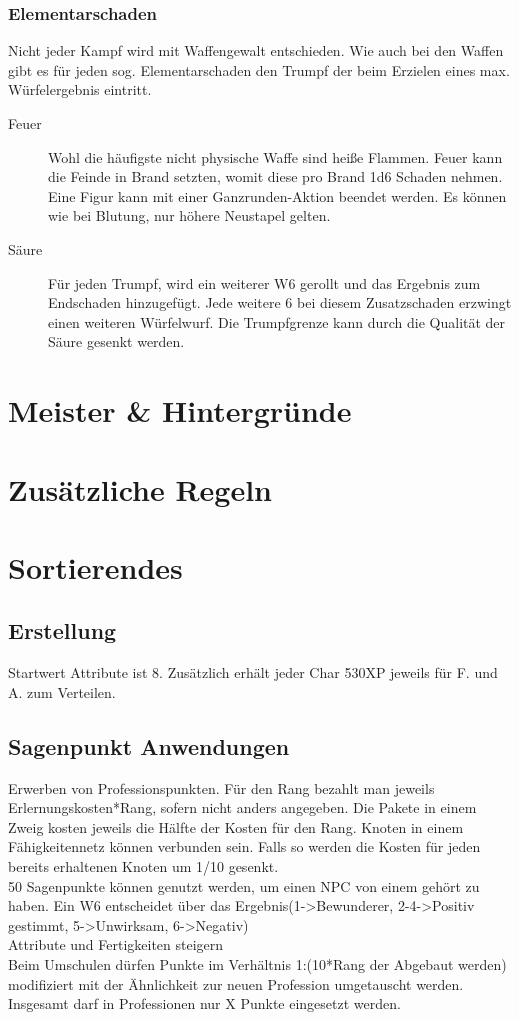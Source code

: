 \documentclass[a4paper,12pt,oneside]{book}
\begin{document}
\section{Elementarschaden}
Nicht jeder Kampf wird mit Waffengewalt entschieden. Wie auch bei den Waffen gibt es für jeden sog. Elementarschaden den Trumpf der beim Erzielen eines max. Würfelergebnis eintritt.
\begin{description}
\item[Feuer]Wohl die häufigste nicht physische Waffe sind heiße Flammen. Feuer kann die Feinde in Brand setzten, womit diese pro Brand 1d6 Schaden nehmen. Eine Figur kann mit einer Ganzrunden-Aktion beendet werden. Es können wie bei Blutung, nur höhere Neustapel gelten.
\item[Säure]Für jeden Trumpf, wird ein weiterer W6 gerollt und das Ergebnis zum Endschaden hinzugefügt. Jede weitere 6 bei diesem Zusatzschaden erzwingt einen weiteren Würfelwurf. Die Trumpfgrenze kann durch die Qualität der Säure gesenkt werden.
\end{description}

\part{Meister \& Hintergründe}
\setcounter{chapter}{0}
\part{Zusätzliche Regeln}
\setcounter{chapter}{0}

\part{Sortierendes}

\chapter{Erstellung}
Startwert Attribute ist 8.
Zusätzlich erhält jeder Char 530XP jeweils für F. und A. zum Verteilen.

\chapter{Sagenpunkt Anwendungen}
Erwerben von Professionspunkten. Für den Rang bezahlt man jeweils Erlernungskosten*Rang, sofern nicht anders angegeben. Die Pakete in einem Zweig kosten jeweils die Hälfte der Kosten für den Rang. Knoten in einem Fähigkeitennetz können verbunden sein. Falls so werden die Kosten für jeden bereits erhaltenen Knoten um 1/10 gesenkt.
\\50 Sagenpunkte können genutzt werden, um einen NPC von einem gehört zu haben. Ein W6 entscheidet über das Ergebnis(1->Bewunderer, 2-4->Positiv gestimmt, 5->Unwirksam, 6->Negativ)
\\Attribute und Fertigkeiten steigern
\\Beim Umschulen dürfen Punkte im Verhältnis 1:(10*Rang der Abgebaut werden) modifiziert mit der Ähnlichkeit zur neuen Profession umgetauscht werden. 
\\Insgesamt darf in Professionen nur X Punkte eingesetzt werden.
\end{document}
